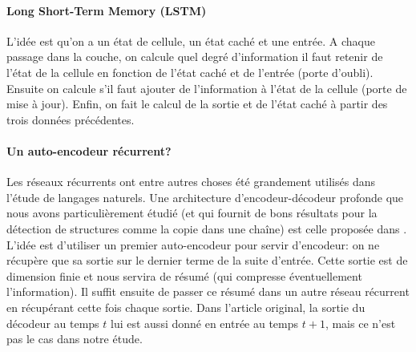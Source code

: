 \documentclass[a4paper, 11pt, onecolumn]{article}
\begin{document}
\paragraph{Long Short-Term Memory (LSTM)}

L'idée est qu'on a un état de
cellule, un état caché et une entrée. A chaque passage dans la couche, on calcule
quel degré d'information il faut retenir de l'état de la cellule en fonction de
l'état caché et de l'entrée (porte d'oubli). Ensuite on calcule s'il faut ajouter de
l'information à l'état de la cellule (porte de mise à jour). Enfin, on fait le calcul de la sortie et
de l'état caché à partir des trois données précédentes.



\paragraph{Un auto-encodeur récurrent?}

Les réseaux récurrents ont entre autres choses été grandement utilisés dans
l'étude de langages naturels. Une architecture d'encodeur-décodeur profonde que nous avons particulièrement étudié
(et qui fournit de bons résultats pour la détection de structures comme la copie
dans une chaîne) est celle proposée dans \cite{DBLP:journals/corr/ChoMGBSB14}.
L'idée est d'utiliser un premier auto-encodeur pour servir d'encodeur: on ne
récupère que sa sortie sur le dernier terme de la suite d'entrée. Cette sortie
est de dimension finie et nous servira de résumé (qui compresse éventuellement
l'information). Il suffit ensuite de passer ce résumé dans un autre
réseau récurrent en récupérant cette fois chaque sortie. Dans
l'article original, la sortie du décodeur au temps $t$ lui est aussi donné en
entrée au temps $t+1$, mais ce n'est pas le cas dans notre étude.
\end{document}
